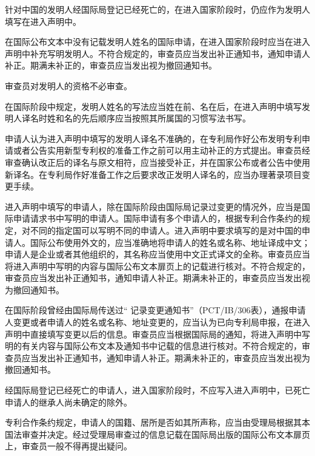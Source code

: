针对中国的发明人经国际局登记已经死亡的，在进入国家阶段时，仍应作为发明人填写在进入声明中。

{\setlength{\parindent}{0.0bp}在国际公布文本中没有记载发明人姓名的国际申请，在进入国家阶段时应当在进入声明中补充写明发明人。不符合规定的，审查员应当发出补正通知书，通知申请人补正。期满未补正的，审查员应当发出视为撤回通知书。\par}

审查员对发明人的资格不必审查。

在国际阶段中规定，发明人姓名的写法应当姓在前、名在后，在进入声明中填写发明人译名时姓和名的先后顺序应当按照其所属国的习惯写法书写。

申请人认为进入声明中填写的发明人译名不准确的，在专利局作好公布发明专利申请或者公告实用新型专利权的准备工作之前可以用主动补正的方式提出。审查员经审查确认改正后的译名与原文相符，应当接受补正，并在国家公布或者公告中使用新译名。在专利局作好准备工作之后要求改正发明人译名的，应当办理著录项目变更手续。

{\setlength{\parindent}{0.0bp}进入声明中填写的申请人，除在国际阶段由国际局记录过变更的情况外，应当是国际申请请求书中写明的申请人。国际申请有多个申请人的，根据专利合作条约的规定，对不同的指定国可以写明不同的申请人。进入声明中要求填写的是对中国的申请人。国际公布使用外文的，应当准确地将申请人的姓名或名称、地址译成中文；申请人是企业或者其他组织的，其名称应当使用中文正式译文的全称。审查员应当将进入声明中写明的内容与国际公布文本扉页上的记载进行核对。不符合规定的，审查员应当发出补正通知书，通知申请人补正。期满未补正的，审查员应当发出视为撤回通知书。\par}

在国际阶段曾经由国际局传送过“ 记录变更通知书”（PCT/IB/306表），通报申请人变更或者申请人的姓名或名称、地址变更的，应当认为已向专利局申报，在进入声明中直接填写变更以后的信息。审查员应当根据国际局的通知，将进入声明中写明的有关内容与国际公布文本及通知书中记载的信息进行核对。不符合规定的，审查员应当发出补正通知书，通知申请人补正。期满未补正的，审查员应当发出视为撤回通知书。

经国际局登记已经死亡的申请人，进入国家阶段时，不应写入进入声明中，已死亡申请人的继承人尚未确定的除外。

专利合作条约规定，申请人的国籍、居所是否如其所声称，应当由受理局根据其本国法审查并决定。经过受理局审查过的信息记载在国际局出版的国际公布文本扉页上，审查员一般不得再提出疑问。


